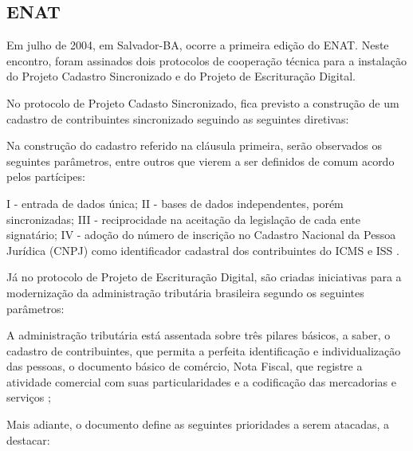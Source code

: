 \subsection{ENAT}

Em julho de 2004, em Salvador-BA, ocorre a primeira edição do ENAT. Neste encontro, foram assinados dois protocolos de cooperação  técnica para a instalação do Projeto Cadastro Sincronizado e do Projeto de Escrituração Digital.

No protocolo de Projeto Cadasto Sincronizado, fica previsto a construção de um cadastro de contribuintes sincronizado seguindo as seguintes diretivas:

\begin{citacao}
Na construção do cadastro referido na cláusula primeira,
serão observados os seguintes parâmetros, entre outros que vierem a ser definidos de comum
acordo pelos partícipes:

I - entrada de dados única;
II - bases de dados independentes, porém sincronizadas;
III - reciprocidade na aceitação da legislação de cada ente signatário;
IV - adoção do número de inscrição no Cadastro Nacional da Pessoa Jurídica (CNPJ)
como identificador cadastral dos contribuintes do ICMS e ISS \cite{enat:2004:protocolo1}.
\end{citacao}

Já no protocolo de Projeto de Escrituração Digital, são criadas iniciativas para a modernização da administração tributária brasileira segundo os seguintes parâmetros:

\begin{citacao}
A administração tributária está assentada sobre três pilares básicos, a
saber, o cadastro de contribuintes, que permita a perfeita identificação e individualização das
pessoas, o documento básico de comércio, Nota Fiscal, que registre a atividade comercial com
suas particularidades e a codificação das mercadorias e serviços \cite{enat:2004:protocolo1};
\end{citacao}

Mais adiante, o documento define as seguintes prioridades a serem atacadas, a destacar:

